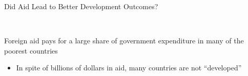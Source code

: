 \documentclass[10pt,xcolor=table,ignorenonframetext,handout,aspectratio=169]{beamer}
\newlength{\wideitemsep}
\let\olditem\item
\renewcommand{\item}{\setlength{\itemsep}{\wideitemsep}\olditem}
\begin{document}
\begin{frame}{Did Aid Lead to Better Development Outcomes?}

\begin{center}
	 $\ \ $	 \\
	
	\medskip
	\medskip
	
	Foreign aid pays for a large share of government expenditure in many of the poorest countries 
	
	\medskip
	\begin{itemize}
		
		\item In spite of billions of dollars in aid, many countries are not ``developed''
		
	\end{itemize}
\end{center}

\end{frame}


\end{document}
